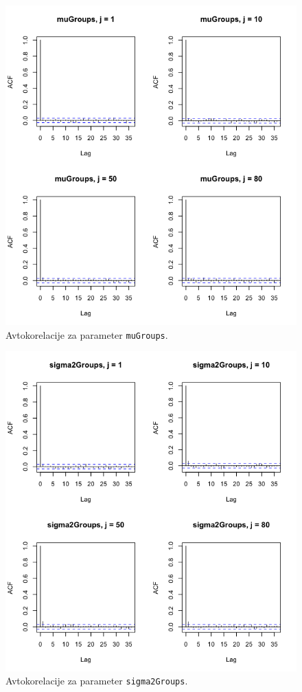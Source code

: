 \documentclass[a4paper,11pt]{article}
\begin{document}
\begin{figure}[ht!]
    \centering
    \includegraphics[width = 160mm]{Slike/avto_muGroups.png}
    \caption{Avtokorelacije za parameter \texttt{muGroups}.}
\end{figure}
\newpage
\begin{figure}[ht!]
    \centering
    \includegraphics[width = 160mm]{Slike/avto_sigma2Groups.png}
    \caption{Avtokorelacije za parameter \texttt{sigma2Groups}.}
\end{figure}
\end{document}
